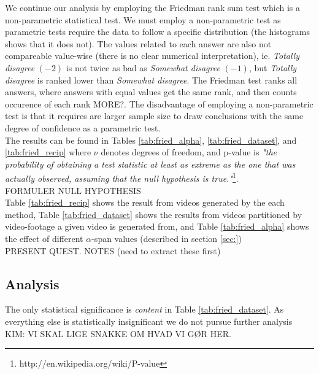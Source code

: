 %
We continue our analysis by employing the Friedman rank sum test which is a non-parametric statistical test. We must employ a non-parametric test as parametric tests require the data to follow a specific distribution (the histograms shows that it does not). The values related to each answer are also not compareable value-wise (there is no clear numerical interpretation), ie. \textit{Totally disagree} $(-2)$ is not twice as bad as \textit{Somewhat disagree} $(-1)$, but \textit{Totally disagree} is ranked lower than \textit{Somewhat disagree}. The Friedman test ranks all answers, where answers with equal values get the same rank, and then counts occurence of each rank MORE?. The disadvantage of employing a non-parametric test is that it requires are larger sample size to draw conclusions with the same degree of confidence as a parametric test.\\ 
The results can be found in Tables \ref{tab:fried_alpha}, \ref{tab:fried_dataset}, and \ref{tab:fried_recip} where $\nu$ denotes degrees of freedom, and p-value is \textit{"the probability of obtaining a test statistic at least as extreme as the one that was actually observed, assuming that the null hypothesis is true."}\footnote{http://en.wikipedia.org/wiki/P-value}.\\
FORMULER NULL HYPOTHESIS\\
%



%
Table \ref{tab:fried_recip} shows the result from videos generated by the each method, Table \ref{tab:fried_dataset} shows the results from videos partitioned by video-footage a given video is generated from, and Table \ref{tab:fried_alpha} shows the effect of different $\alpha$-span values (described in section \ref{sec:})\\
%
PRESENT QUEST. NOTES (need to extract these first)
%
\subsection{Analysis}
%
The only statistical significance is \textit{content} in Table \ref{tab:fried_dataset}. As everything else is statistically insignificant we do not pursue further analysis KIM: VI SKAL LIGE SNAKKE OM HVAD VI GØR HER.
%
